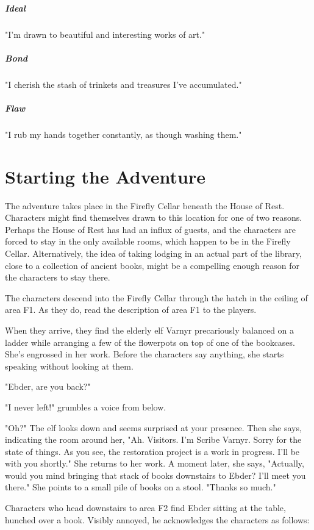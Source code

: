 \documentclass[10pt,a4paper,twoside,bg=print,twocolumn,openany,nodeprecatedcode]{dndbook}
\begin{document}
\subparagraph{Ideal}
"I'm drawn to beautiful and interesting works of art."

\subparagraph{Bond}
"I cherish the stash of trinkets and treasures I've accumulated."

\subparagraph{Flaw}
"I rub my hands together constantly, as though washing them."

\section{Starting the Adventure}
The adventure takes place in the Firefly Cellar beneath the House of Rest. Characters might find themselves drawn to this location for one of two reasons. Perhaps the House of Rest has had an influx of guests, and the characters are forced to stay in the only available rooms, which happen to be in the Firefly Cellar. Alternatively, the idea of taking lodging in an actual part of the library, close to a collection of ancient books, might be a compelling enough reason for the characters to stay there.

The characters descend into the Firefly Cellar through the hatch in the ceiling of area F1. As they do, read the description of area F1 to the players.

When they arrive, they find the elderly elf Varnyr precariously balanced on a ladder while arranging a few of the flowerpots on top of one of the bookcases. She's engrossed in her work. Before the characters say anything, she starts speaking without looking at them.

\begin{DndReadAloud}{}
"Ebder, are you back?"

"I never left!" grumbles a voice from below.

"Oh?" The elf looks down and seems surprised at your presence. Then she says, indicating the room around her, "Ah. Visitors. I'm Scribe Varnyr. Sorry for the state of things. As you see, the restoration project is a work in progress. I'll be with you shortly." She returns to her work. A moment later, she says, "Actually, would you mind bringing that stack of books downstairs to Ebder? I'll meet you there." She points to a small pile of books on a stool. "Thanks so much."

\end{DndReadAloud}

Characters who head downstairs to area F2 find Ebder sitting at the table, hunched over a book. Visibly annoyed, he acknowledges the characters as follows:
\end{document}
